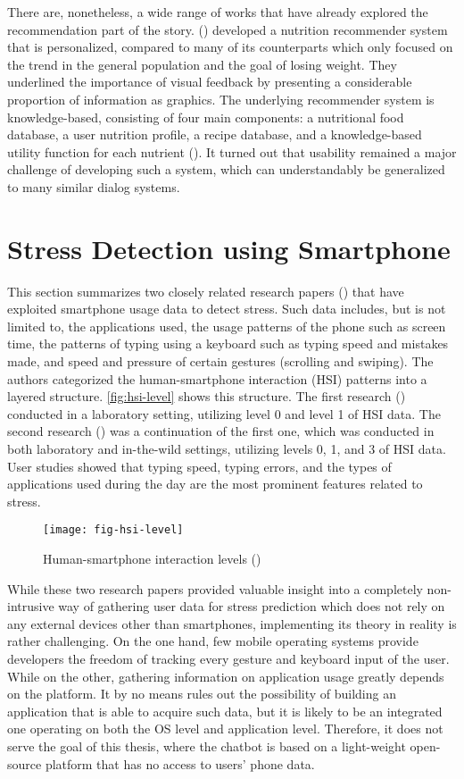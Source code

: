 \noindent There are, nonetheless, a wide range of works that have already explored the recommendation part of the story. \citeauthor{18_nutrilize} (\citeyear{18_nutrilize}) developed a nutrition recommender system that is personalized, compared to many of its counterparts which only focused on the trend in the general population and the goal of losing weight. They underlined the importance of visual feedback by presenting a considerable proportion of information as graphics. The underlying recommender system is knowledge-based, consisting of four main components: a nutritional food database, a user nutrition profile, a recipe database, and a knowledge-based utility function for each nutrient (\cite{18_nutrilize}). It turned out that usability remained a major challenge of developing such a system, which can understandably be generalized to many similar dialog systems.

\section{Stress Detection using Smartphone}
This section summarizes two closely related research papers (\cite{20_ciman, 21_ciman_2}) that have exploited smartphone usage data to detect stress. Such data includes, but is not limited to, the applications used, the usage patterns of the phone such as screen time, the patterns of typing using a keyboard such as typing speed and mistakes made, and speed and pressure of certain gestures (scrolling and swiping). The authors categorized the human-smartphone interaction (HSI) patterns into a layered structure. \autoref{fig:hsi-level} shows this structure. The first research (\cite{20_ciman}) conducted in a laboratory setting, utilizing level 0 and level 1 of HSI data. The second research (\cite{21_ciman_2}) was a continuation of the first one, which was conducted in both laboratory and in-the-wild settings, utilizing levels 0, 1, and 3 of HSI data. User studies showed that typing speed, typing errors, and the types of applications used during the day are the most prominent features related to stress.

\begin{figure}[ht]
  \centering
  \texttt{[image: fig-hsi-level]}
  \caption{Human-smartphone interaction levels (\cite{21_ciman_2})}
  \label{fig:hsi-level}
\end{figure}

While these two research papers provided valuable insight into a completely non-intrusive way of gathering user data for stress prediction which does not rely on any external devices other than smartphones, implementing its theory in reality is rather challenging. On the one hand, few mobile operating systems provide developers the freedom of tracking every gesture and keyboard input of the user. While on the other, gathering information on application usage greatly depends on the platform. It by no means rules out the possibility of building an application that is able to acquire such data, but it is likely to be an integrated one operating on both the OS level and application level. Therefore, it does not serve the goal of this thesis, where the chatbot is based on a light-weight open-source platform that has no access to users' phone data.

